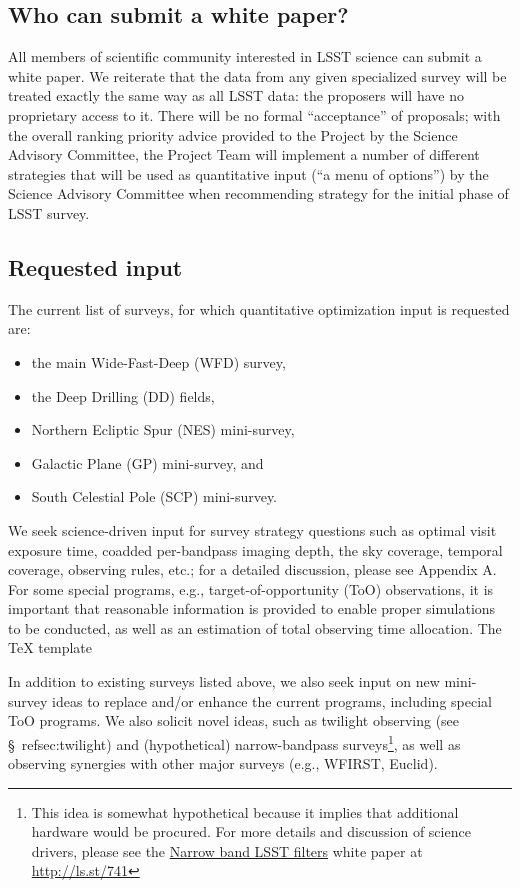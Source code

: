 \documentclass[DM,lsstdraft,toc,usenatbib]{lsstdoc}
\begin{document}
\subsection{Who can submit a white paper?} 

All members of scientific community interested in LSST science can submit a white paper. 
We reiterate that the data from any given specialized survey will be treated exactly the same 
way as all LSST data: the proposers will have no proprietary access to it. There will be no 
formal ``acceptance'' of proposals; with the overall ranking priority advice provided to the 
Project by the Science Advisory Committee, the Project Team will implement a number of
different strategies that will be used as quantitative input (``a menu of options'') by the 
Science Advisory Committee when recommending strategy for the initial phase of LSST survey. 


\subsection{Requested input}

The current list of surveys, for which quantitative optimization input is requested are:
\begin{itemize}
\item the main Wide-Fast-Deep (WFD) survey,
\item the Deep Drilling (DD) fields,
\item Northern Ecliptic Spur (NES) mini-survey, 
\item Galactic Plane (GP) mini-survey, and
\item South Celestial Pole (SCP) mini-survey.
\end{itemize}

We seek science-driven input for survey strategy questions such as optimal visit exposure time,
coadded per-bandpass imaging depth, the sky coverage, temporal coverage, observing
rules, etc.; for a detailed discussion, please see Appendix A. For some special programs, 
e.g., target-of-opportunity (ToO) observations, it is important that reasonable
information is provided to enable proper simulations to be conducted, as well as an estimation
of total observing time allocation. The TeX template

In addition to existing surveys listed above, we also seek input on new mini-survey ideas 
to replace and/or enhance the current programs, including special ToO programs. We also 
solicit novel ideas, such as twilight observing (see \S~ref{sec:twilight}) 
and (hypothetical) narrow-bandpass surveys\footnote{This idea is somewhat hypothetical 
because it implies that additional hardware would be procured. For more details and 
discussion of science drivers, please see the \href{http://ls.st/741}{Narrow band LSST filters} white paper at \url{http://ls.st/741}}, 
as well as observing synergies with other major surveys (e.g., WFIRST, Euclid). 
\end{document}
